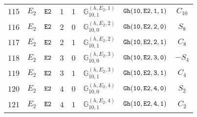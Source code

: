 \documentclass[fleqn,8pt]{jsarticle}
\begin{document}
\begin{table}[ht!]
\begin{center}
\begin{tabular}{cccccccc}
$ 115 $ & $ E_{2} $ & $ {\tt E2} $ & $ 1 $ & $ 1 $ & $ \mathbb{G}_{10,1}^{(h,E_{2},1)} $ & $ {\tt Gh(10,E2,1,1)} $ & $ C_{10} $ \\
$ 116 $ & $ E_{2} $ & $ {\tt E2} $ & $ 2 $ & $ 0 $ & $ \mathbb{G}_{10,0}^{(h,E_{2},2)} $ & $ {\tt Gh(10,E2,2,0)} $ & $ S_{8} $ \\
$ 117 $ & $ E_{2} $ & $ {\tt E2} $ & $ 2 $ & $ 1 $ & $ \mathbb{G}_{10,1}^{(h,E_{2},2)} $ & $ {\tt Gh(10,E2,2,1)} $ & $ C_{8} $ \\
$ 118 $ & $ E_{2} $ & $ {\tt E2} $ & $ 3 $ & $ 0 $ & $ \mathbb{G}_{10,0}^{(h,E_{2},3)} $ & $ {\tt Gh(10,E2,3,0)} $ & $ - S_{4} $ \\
$ 119 $ & $ E_{2} $ & $ {\tt E2} $ & $ 3 $ & $ 1 $ & $ \mathbb{G}_{10,1}^{(h,E_{2},3)} $ & $ {\tt Gh(10,E2,3,1)} $ & $ C_{4} $ \\
$ 120 $ & $ E_{2} $ & $ {\tt E2} $ & $ 4 $ & $ 0 $ & $ \mathbb{G}_{10,0}^{(h,E_{2},4)} $ & $ {\tt Gh(10,E2,4,0)} $ & $ S_{2} $ \\
$ 121 $ & $ E_{2} $ & $ {\tt E2} $ & $ 4 $ & $ 1 $ & $ \mathbb{G}_{10,1}^{(h,E_{2},4)} $ & $ {\tt Gh(10,E2,4,1)} $ & $ C_{2} $ \\
 \hline \hline
\end{tabular}
\end{center}
\end{table}
\end{document}
